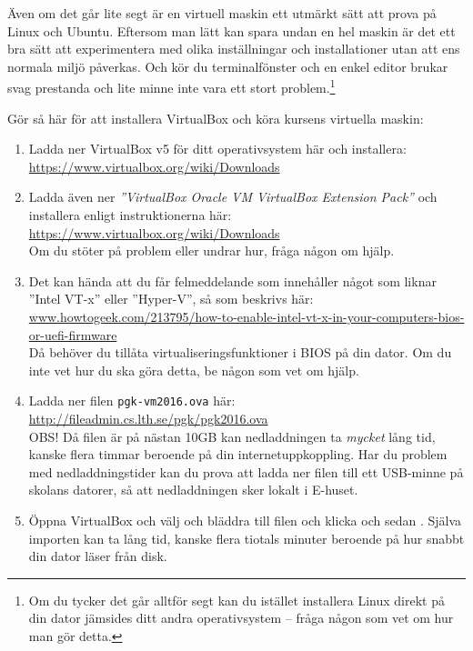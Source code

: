 Även om det går lite segt är en virtuell maskin ett utmärkt sätt att prova på Linux och Ubuntu. Eftersom man lätt kan spara undan en hel maskin är det ett bra sätt att experimentera med olika inställningar och installationer utan att ens normala miljö påverkas. Och kör du terminalfönster och en enkel editor brukar svag prestanda och lite minne inte vara ett stort problem.\footnote{Om du tycker det går alltför segt kan du istället installera Linux direkt på din dator jämsides ditt andra operativsystem -- fråga någon som vet om hur man gör detta.} 

Gör så här för att installera VirtualBox och köra kursens virtuella maskin:
\begin{enumerate}
\item  Ladda ner VirtualBox v5 för ditt operativsystem här och installera: \\ \url{https://www.virtualbox.org/wiki/Downloads}

\item Ladda även ner \textit{''VirtualBox Oracle VM VirtualBox Extension Pack''}  och installera enligt instruktionerna här:\\ \url{https://www.virtualbox.org/wiki/Downloads} \\ Om du stöter på problem eller undrar hur, fråga någon om hjälp.

\item Det kan hända att du får felmeddelande som innehåller något som liknar ''Intel VT-x'' eller ''Hyper-V'', så som beskrivs här:
\\ \href{http://www.howtogeek.com/213795/how-to-enable-intel-vt-x-in-your-computers-bios-or-uefi-firmware/}{www.howtogeek.com/213795/how-to-enable-intel-vt-x-in-your-computers-bios-or-uefi-firmware}\\
Då behöver du tillåta virtualiseringsfunktioner i BIOS på din dator. Om du inte vet hur du ska göra detta, be någon som vet om hjälp.

\item     Ladda ner filen \texttt{pgk-vm2016.ova} här: \\ \url{http://fileadmin.cs.lth.se/pgk/pgk2016.ova} \\ OBS! Då filen är på nästan 10GB kan nedladdningen ta \textit{mycket} lång tid, kanske flera timmar beroende på din internetuppkoppling. Har du problem med nedladdningstider kan du prova att ladda ner filen till ett USB-minne på skolans datorer, så att nedladdningen sker lokalt i E-huset.

\item     Öppna VirtualBox och välj  och bläddra till filen  och klicka  och sedan . Själva importen kan ta lång tid, kanske flera tiotals minuter beroende på hur snabbt din dator läser från disk.


\end{enumerate}
